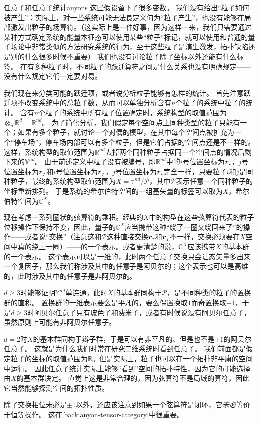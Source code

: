 \begin{back}{任意子和任意子统计}{anyons}
    这些假设留下了很多变数。
    我们没有给出“粒子如何被产生”：实际上，对一些系统可能无法良定义何为“粒子产生”，也没有能够在局部激发出粒子的场算符。（这实际上是一件好事，因为这样一来，我们只需要通过某种方式确定系统的能量本征态可以使用某些“粒子”标记，就可以使用和普通的量子场论中非常类似的方法研究系统的行为，至于这些粒子是演生激发，拓扑缺陷还是别的什么很多时候不重要）
    我们也没有讨论粒子除了坐标以外还能有什么标签。
    在有多种粒子时，不同粒子的跃迁算符之间是什么关系也没有明确规定——没有什么规定它们一定要对易。

    我们现在来分类可能的跃迁项，或者说分析粒子能够有怎样的统计。
    首先注意跃迁项不改变系统中的总粒子数，从而可以单独分析含有$n$个粒子的系统中粒子的统计。
    含有$n$个粒子的系统中所有粒子位置确定时，系统构型的取值范围为$\otimes_{n} \mathbb{R}^d = \mathbb{R}^{nd}$。
    为了简化分析，我们假定每个空间点上同种类型的粒子只能有一个；如果有多个粒子，就讨论一个对偶的模型，在其中每个空间点被扩充为一个“停车场”，停车场内部可以有多个粒子，但是它们占据的空间点还是不一样的。
    这样，系统构型的取值范围为$\mathbb{R}^{nd}$去掉两个同种粒子占据同一个空间点的情况后剩下来的$\mathbb{Y}^{nd}$。
    由于前述定义中粒子没有被编号，即$\mathbb{R}^{nd}$中的$i$号位置坐标为$\vb*{r}_i$，$j$号位置坐标为$\vb*{r}_j$和$i$号位置坐标为$\vb*{r}_j$，$j$号位置坐标为$\vb*{r}_i$完全一样，只要粒子$i$和$j$是同种粒子，最终的系统构型取值范围为$X = \mathbb{Y}^{nd} / \mathcal{P}$，其中$\mathcal{P}$表示任意一个同种粒子的坐标重新排列。
    于是系统的希尔伯特空间的一组基矢量的标签可以取为$X$，希尔伯特空间为$\mathbb{C}^{X}$。

    现在考虑一系列圈状的弦算符的乘积。经典的$X$中的构型在这些弦算符代表的粒子位移操作下保持不变，因此，量子的$\mathbb{C}^X$应当携带这种“绕了一圈又绕回来了”的操作——或者说“交换”（注意这和$\mathcal{P}$这种直接交换$\vb*{r}_i$和$\vb*{r}_j$不一样，交换必须要在$X$空间中真的绕上一圈）——的一个表示。或者更清楚的说，$\mathbb{C}^X$应该携带$X$的基本群的一个表示。
    这个表示可以是一维的，此时两个任意子交换只会让态矢量多出来一个复因子，那么我们称涉及其中的任意子是阿贝尔的；这个表示也可以是高维的，此时涉及其中的任意子是非阿贝尔的。

    $d \geq 3$时能够证明$\mathbb{Y}^{nd}$单连通，此时$X$的基本群同构于$\mathcal{P}$，是不同种类的粒子的置换群的直积。
    置换群的一维表示要么是平凡的，要么偶置换取$1$而奇置换取$-1$，于是$d \geq 3$时阿贝尔任意子只有玻色子和费米子，或者有时候说没有阿贝尔任意子，虽然原则上可能有非阿贝尔任意子。%

    $d=2$时$X$的基本群同构于辫子群，于是可以有非平凡的、但是也不是$\pm 1$的阿贝尔任意子。
    这就是为什么我们时常在研究二维系统时看到任意子。
    我们前面都是假定粒子的坐标的取值范围为$\mathbb{R}$。但是实际上，粒子也可以在一个拓扑非平庸的空间中运行。
    因此任意子统计实际上能够“看到”空间的拓扑特性，因为它的可能选择由$X$的基本群决定。
    直觉上这是非常合理的，因为弦算符不是局域的算符，因此它当然能够探测空间的拓扑性质。

    除了交换相位未必是$\pm 1$以外，还应该注意到如果一个弦算符是闭环，它\emph{未必}等价于恒等操作。
    这在\autoref{back:anyon-tensor-category}中很重要。
\end{back}

